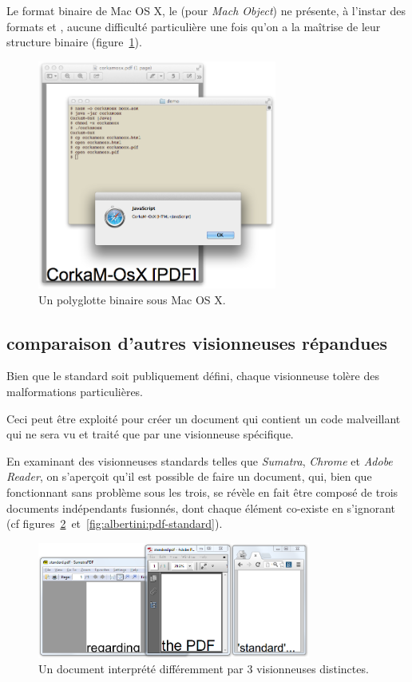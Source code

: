 Le format binaire de Mac OS X, le \MACHO (pour \emph{Mach Object}) ne présente, à l'instar des formats \PE et \ELF, aucune difficulté particulière une fois qu'on a la maîtrise de leur structure binaire (figure~\ref{fig:albertini:corkamosx}).
\begin{figure}[p]
  \centering
  \includegraphics[width=0.7\textwidth]{albertini/img/corkamosx}
  \caption{Un polyglotte binaire sous Mac OS X.}
  \label{fig:albertini:corkamosx}
\end{figure}


\subsection{comparaison d'autres visionneuses \PDF répandues}

Bien que le standard \PDF soit publiquement défini, chaque visionneuse tolère des malformations particulières.

Ceci peut être exploité pour créer un document qui contient un code malveillant qui ne sera vu et traité que par une visionneuse spécifique.

En examinant des visionneuses standards telles que {\em Sumatra}, {\em Chrome} et {\em Adobe Reader}, on s'aperçoit qu'il est possible de faire un document, qui, bien que fonctionnant sans problème sous les trois, se révèle en fait être composé de trois documents indépendants fusionnés, dont chaque élément co-existe en s'ignorant (cf figures~\ref{fig:albertini:pdf-pdf_standardmerged}~et~\ref{fig:albertini:pdf-standard}).

\begin{figure}[ht]
  \centering
  \includegraphics[width=0.8\textwidth]{albertini/img/pdf_standardmerged}
  \caption{Un document interprété différemment par 3 visionneuses distinctes.}
  \label{fig:albertini:pdf-pdf_standardmerged}
\end{figure}

